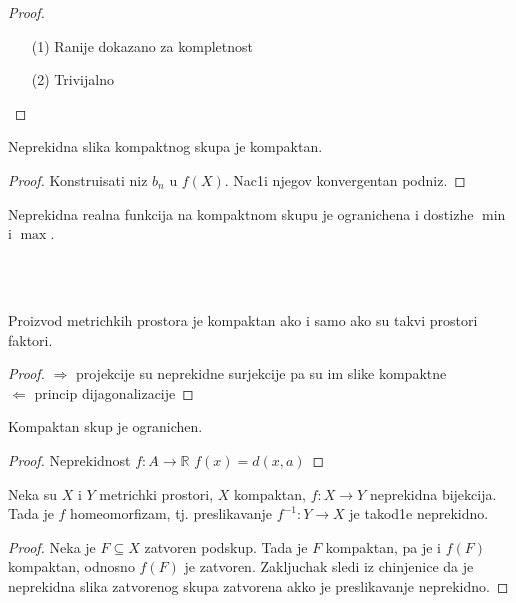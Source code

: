 \documentclass[a4paper,12pt]{article}
\newcommand{\RR}{\mathbb{R}}
\newcommand{\psj}{\subseteq}
\begin{document}
\newpage

\begin{proof}
\begin{itemize}
\item[(1)] Ranije dokazano za kompletnost
\item[(2)] Trivijalno
\end{itemize}
\end{proof}

\begin{tvr}
Neprekidna slika kompaktnog skupa je kompaktan.
\end{tvr}
\begin{proof}
Konstruisati niz $b_n$ u $f(X)$. Nac1i njegov konvergentan podniz.
\end{proof}

\begin{posl}
Neprekidna realna funkcija na kompaktnom skupu je ogranichena i dostizhe $\min$ i $\max$.
\end{posl}
\\ \\
\begin{tvr}
Proizvod metrichkih prostora je kompaktan ako i samo ako su takvi prostori faktori.
\end{tvr}
\begin{proof}
$\boxed{\Rightarrow}$ projekcije su neprekidne surjekcije pa su im slike kompaktne \\ 
$\boxed{\Leftarrow}$ princip dijagonalizacije
\end{proof}

\begin{tvr}
Kompaktan skup je ogranichen.
\end{tvr}
\begin{proof}
Neprekidnost $f: A \to \RR$ $f(x)=d(x,a)$
\end{proof}

\begin{tvr}
Neka su $X$ i $Y$ metrichki prostori, $X$ kompaktan, $f: X \to Y$ neprekidna bijekcija. Tada je $f$ homeomorfizam, tj. preslikavanje $f^{-1}:Y \to X$ je takod1e neprekidno.
\end{tvr}
\begin{proof}
Neka je $F \psj X$ zatvoren podskup. Tada je $F$ kompaktan, pa je i $f(F)$ kompaktan, odnosno $f(F)$ je zatvoren. Zakljuchak sledi iz chinjenice da je neprekidna slika zatvorenog skupa zatvorena akko je preslikavanje neprekidno.
\end{proof}
\end{document}
